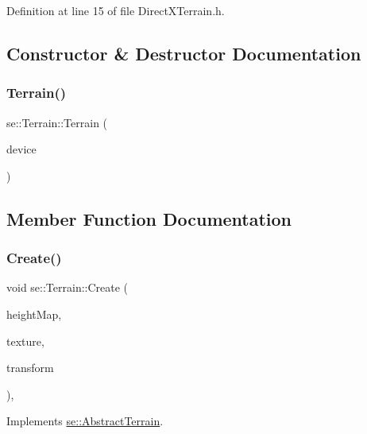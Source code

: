 Definition at line 15 of file Direct\+X\+Terrain.\+h.



\subsection{Constructor \& Destructor Documentation}
\mbox{\label{classse_1_1_terrain_aba0253655814ae0fab2b1145e2a4e3d2}} 
\subsubsection{\texorpdfstring{Terrain()}{Terrain()}}
{\footnotesize\ttfamily se\+::\+Terrain\+::\+Terrain (\begin{DoxyParamCaption}\item[{L\+P\+D\+I\+R\+E\+C\+T3\+D\+D\+E\+V\+I\+C\+E9}]{device }\end{DoxyParamCaption})}



\subsection{Member Function Documentation}
\mbox{\label{classse_1_1_terrain_a67309f26fbbf361cc38d2e7e62264648}} 
\subsubsection{\texorpdfstring{Create()}{Create()}}
{\footnotesize\ttfamily void se\+::\+Terrain\+::\+Create (\begin{DoxyParamCaption}\item[{const std\+::string \&}]{height\+Map,  }\item[{const std\+::string \&}]{texture,  }\item[{\mbox{\hyperlink{classse_1_1_transform3f}{Transform3f}} \&}]{transform }\end{DoxyParamCaption})\hspace{0.3cm}{\ttfamily [override]}, {\ttfamily [virtual]}}



Implements \mbox{\hyperlink{classse_1_1_abstract_terrain_ab064ca434de133a78a0899fe53caea99}{se\+::\+Abstract\+Terrain}}.

